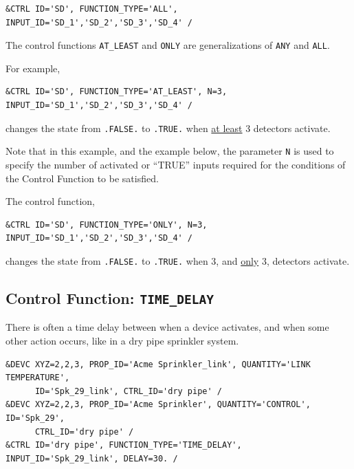 \documentclass[11pt]{book}
\newcommand{\ct}{\tt\small}
\begin{document}
\footnotesize
\begin{verbatim}
&CTRL ID='SD', FUNCTION_TYPE='ALL', INPUT_ID='SD_1','SD_2','SD_3','SD_4' /
\end{verbatim}
\normalsize

\noindent

The control functions {\ct AT\_LEAST} and {\ct ONLY} are generalizations of {\ct ANY} and {\ct ALL}.

For example,

\footnotesize
\begin{verbatim}
&CTRL ID='SD', FUNCTION_TYPE='AT_LEAST', N=3, INPUT_ID='SD_1','SD_2','SD_3','SD_4' /
\end{verbatim}

\normalsize
\noindent
changes the state from {\ct .FALSE.} to {\ct .TRUE.} when \underline{at least}
3 detectors activate.

Note that in this example, and the example below, the parameter {\ct N} is used to
specify the number of activated or ``TRUE'' inputs required for the conditions
of the Control Function to be satisfied.

The control function,

\footnotesize
\begin{verbatim}
&CTRL ID='SD', FUNCTION_TYPE='ONLY', N=3, INPUT_ID='SD_1','SD_2','SD_3','SD_4' /
\end{verbatim}

\normalsize
\noindent
changes the state from {\ct .FALSE.} to {\ct .TRUE.} when 3,
and \underline{only} 3, detectors activate.


\subsection{Control Function: \texorpdfstring{{\tt TIME\_DELAY}}{TIME_DELAY}}

There is often a time delay 
between when a device activates, and when some other action occurs, like in a dry pipe sprinkler system.

\footnotesize
\begin{verbatim}
&DEVC XYZ=2,2,3, PROP_ID='Acme Sprinkler_link', QUANTITY='LINK TEMPERATURE',
      ID='Spk_29_link', CTRL_ID='dry pipe' /
&DEVC XYZ=2,2,3, PROP_ID='Acme Sprinkler', QUANTITY='CONTROL', ID='Spk_29',
      CTRL_ID='dry pipe' /
&CTRL ID='dry pipe', FUNCTION_TYPE='TIME_DELAY', INPUT_ID='Spk_29_link', DELAY=30. /
\end{verbatim}
\normalsize
\end{document}
